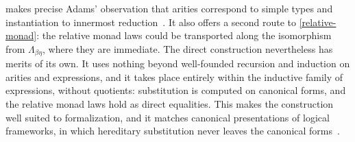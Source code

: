 
\begin{remark}
     makes precise Adams' observation that arities correspond to simple types and instantiation to innermost reduction~\cite[\S2.3]{Adams2008}. It also offers a second route to \cref{relative-monad}: the relative monad laws could be transported along the isomorphism from $\Lambda_{\beta\eta}$, where they are immediate. The direct construction nevertheless has merits of its own. It uses nothing beyond well-founded recursion and induction on arities and expressions, and it takes place entirely within the inductive family of expressions, without quotients: substitution is computed on canonical forms, and the relative monad laws hold as direct equalities. This makes the construction well suited to formalization, and it matches canonical presentations of logical frameworks, in which hereditary substitution never leaves the canonical forms~\cite[\S2]{HarperLicata2007}.
\end{remark}

